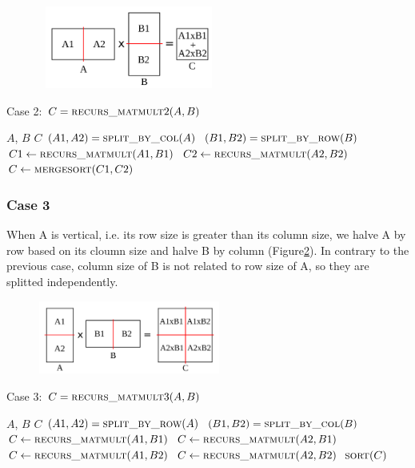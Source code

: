 \begin{figure}[tbh]
 \centering
 \includegraphics[width=6cm,height=2.7cm]{./figures/case2_001.pdf}
 \caption{}
 \label{fig:case2}
\end{figure}

\begin{algorithm}[H] 
  \caption{Case 2: $C = \textsc{recurs\_matmult}2(A, B)$} \label{alg:case2} 
  \begin{algorithmic}[1]
    \Require $A$, $B$
    \Ensure  $C$
    \State $(A1, A2) = \textsc{split\_by\_col}(A)$
    \State $(B1, B2) = \textsc{split\_by\_row}(B)$
    \State $C1 \leftarrow \textsc{recurs\_matmult}(A1,B1)$
    \State $C2 \leftarrow \textsc{recurs\_matmult}(A2,B2)$
    \State $C \leftarrow \textsc{mergesort}(C1, C2)$
  \end{algorithmic}
\end{algorithm}

\subsubsection{Case 3}
\label{sec:case3}
When A is vertical, i.e. its row size is greater than its column size, we halve A by row based on its cloumn size and halve B by column (Figure\ref{fig:case3}). In contrary to the previous case, column size of B is not related to row size of A, so they are splitted independently.

\begin{figure}[tbh]
 \centering
 \includegraphics[width=6cm,height=2.4cm]{./figures/case3_001.pdf}
 \caption{}
 \label{fig:case3}
\end{figure}

\begin{algorithm}[H] 
  \caption{Case 3: $C = \textsc{recurs\_matmult}3(A, B)$} \label{alg:case3} 
  \begin{algorithmic}[1]
    \Require $A$, $B$
    \Ensure  $C$
    \State $(A1, A2) = \textsc{split\_by\_row}(A)$
    \State $(B1, B2) = \textsc{split\_by\_col}(B)$
    \State $C \leftarrow \textsc{recurs\_matmult}(A1,B1)$
    \State $C \leftarrow \textsc{recurs\_matmult}(A2,B1)$
    \State $C \leftarrow \textsc{recurs\_matmult}(A1,B2)$
    \State $C \leftarrow \textsc{recurs\_matmult}(A2,B2)$
    \State $\textsc{sort}(C)$
  \end{algorithmic}
\end{algorithm}

